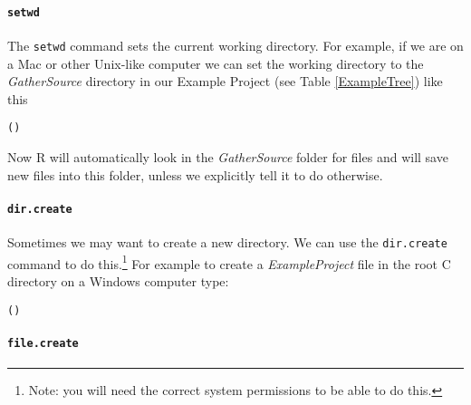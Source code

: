 {\paragraph{{\tt{setwd}}}

The {\tt{setwd}} command sets the current working directory. For example, if we are on a Mac or other Unix-like computer we can set the working directory to the {\emph{GatherSource}} directory in our Example Project (see Table \ref{ExampleTree}) like this

\begin{knitrout}
\color{fgcolor}\begin{kframe}
\begin{alltt}
()
\end{alltt}
\end{kframe}
\end{knitrout}


\noindent Now R will automatically look in the {\emph{GatherSource}} folder for files and will save new files into this folder, unless we explicitly tell it to do otherwise.

\paragraph{{\tt{dir.create}}}

Sometimes we may want to create a new directory. We can use the {\tt{dir.create}} command to do this.\footnote{Note: you will need the correct system permissions to be able to do this.} For example to create a {\emph{ExampleProject}} file in the root C directory on a Windows computer type:

\begin{knitrout}
\color{fgcolor}\begin{kframe}
\begin{alltt}
()
\end{alltt}
\end{kframe}
\end{knitrout}


\paragraph{{\tt{file.create}}}

}
